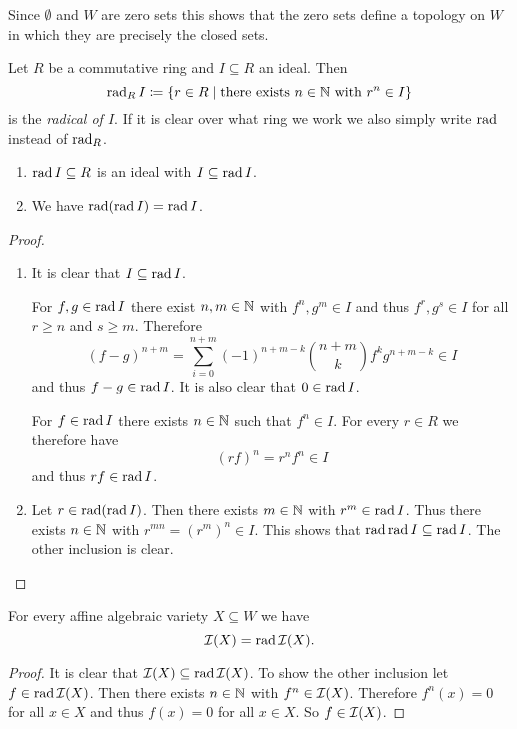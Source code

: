 \begin{rem}
  Since $\emptyset$ and $W$ are zero sets this shows that the zero sets define a topology on $W$ in which they are precisely the closed sets.
\end{rem}


\begin{defi}
  Let $R$ be a commutative ring and $I \subseteq R$ an ideal. Then
  \[
    \operatorname{rad}_R I \coloneqq \{r \in R \mid \text{there exists } n \in \mathbb{N} \text{ with } r^n \in I\}
  \]
  is the \emph{radical of $I$}. If it is clear over what ring we work we also simply write $\operatorname{rad}$ instead of $\operatorname{rad}_R$.
\end{defi}


\begin{lem}
  \begin{enumerate}[label=\emph{\alph*)},leftmargin=*]
    Let $R$ be a commutative ring and $I \subseteq R$ an ideal. 
    \item
      $\operatorname{rad} I  \subseteq R$ is an ideal with $I \subseteq \operatorname{rad} I$.
    \item
      We have $\operatorname{rad}(\operatorname{rad} I) = \operatorname{rad} I$.
  \end{enumerate}
\end{lem}
\begin{proof}
  \begin{enumerate}[label=\emph{\alph*)},leftmargin=*]
    \item
      It is clear that $I \subseteq \operatorname{rad} I$.
      
      For $f,g \in \operatorname{rad} I$ there exist $n,m \in \mathbb{N}$ with $f^n, g^m \in I$ and thus $f^r, g^s \in I$ for all $r \geq n$ and $s \geq m$. Therefore
      \[
        (f-g)^{n+m} = \sum_{i=0}^{n+m} (-1)^{n+m-k} \binom{n+m}{k} f^k g^{n+m-k} \in I
      \]
      and thus $f-g \in \operatorname{rad} I$. It is also clear that $0 \in \operatorname{rad} I$.
      
      For $f \in \operatorname{rad} I$ there exists $n \in \mathbb{N}$ such that $f^n \in I$. For every $r \in R$ we therefore have
      \[
        (rf)^n = r^n f^n \in I
      \]
      and thus $rf \in \operatorname{rad} I$.
    \item
      Let $r \in \operatorname{rad}(\operatorname{rad} I)$. Then there exists $m \in \mathbb{N}$ with $r^m \in \operatorname{rad} I$. Thus there exists $n \in \mathbb{N}$ with $r^{mn} = (r^m)^n \in I$. This shows that $\operatorname{rad} \operatorname{rad} I \subseteq \operatorname{rad} I$. The other inclusion is clear.
    \qedhere
  \end{enumerate}
\end{proof}


\begin{lem}
  For every affine algebraic variety $X \subseteq W$ we have
  \[
  \mathcal{I}(X) = \operatorname{rad} \mathcal{I}(X).
  \]
\end{lem}
\begin{proof}
  It is clear that $\mathcal{I}(X) \subseteq \operatorname{rad} \mathcal{I}(X)$. To show the other inclusion let \mbox{$f \in \operatorname{rad} \mathcal{I}(X)$}. Then there exists $n \in \mathbb{N}$ with $f^n \in \mathcal{I}(X)$. Therefore $f^n(x) = 0$ for all $x \in X$ and thus $f(x) = 0$ for all $x \in X$. So $f \in \mathcal{I}(X)$.
\end{proof}


